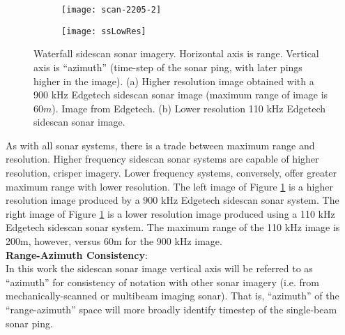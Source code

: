 \begin{figure} [h!]
	\centering
	\begin{subfigure}[b]{0.457\textwidth}
		\texttt{[image: scan-2205-2]}
		\caption{}
  	\end{subfigure}
  	\centering
  	\begin{subfigure}[b]{0.457\textwidth}
  		\texttt{[image: ssLowRes]}
		\caption{}
	\end{subfigure}
	\caption{Waterfall sidescan sonar imagery. Horizontal axis is range. Vertical axis is ``azimuth'' (time-step of the sonar ping, with later pings higher in the image).  (a) Higher resolution image obtained with a 900 kHz Edgetech sidescan sonar image (maximum range of image is  $60m$).  Image from Edgetech. (b) Lower resolution 110 kHz Edgetech sidescan sonar image.}
	\label{fig:sssWaterfalls}
\end{figure}

As with all sonar systems, there is a trade between maximum range and resolution.  
Higher frequency sidescan sonar systems are capable of higher resolution, crisper imagery.  
Lower frequency systems, conversely, offer greater maximum range with lower resolution.
The left image of Figure \ref{fig:sssWaterfalls} is a higher resolution image produced by a 900 kHz Edgetech sidescan sonar system. 
The right image of Figure \ref{fig:sssWaterfalls} is a lower resolution image produced using a 110 kHz Edgetech sidescan sonar system.
The maximum range of the 110 kHz image is 200m, however, versus 60m for the 900 kHz image.
\\

\noindent \textbf{Range-Azimuth Consistency}:
\\

In this work the sidescan sonar image vertical axis will be referred to as ``azimuth'' for consistency of notation with other sonar imagery (i.e. from mechanically-scanned or multibeam imaging sonar).
That is, ``azimuth'' of the ``range-azimuth'' space will more broadly identify timestep of the single-beam sonar ping.

